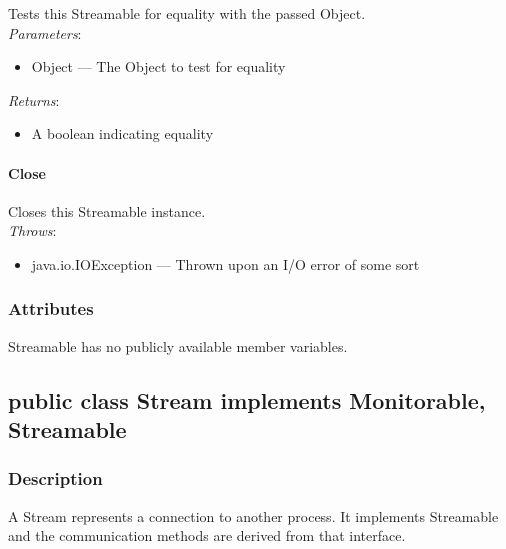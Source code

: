 \documentclass[$Date: 2003/06/26 19:29:31 $]{glabarticle}
\begin{document}
Tests this Streamable for equality with the passed Object.\\

\textit{Parameters}:
\begin{itemize}
\item[] Object --- The Object to test for equality 
\end{itemize}

\textit{Returns}:
\begin{itemize}
\item[] A boolean indicating equality
\end{itemize}

\paragraph{Close}

Closes this Streamable instance. \\

\textit{Throws}:
\begin{itemize}
\item[] java.io.IOException --- Thrown upon an I/O error of some sort 
\end{itemize}


\subsubsection{Attributes}

Streamable has no publicly available member variables. 


\newpage

\subsection{public class Stream implements Monitorable, Streamable}


\subsubsection{Description}

A Stream represents a connection to another process.  It implements
Streamable and the communication methods are derived from that interface.
\end{document}
